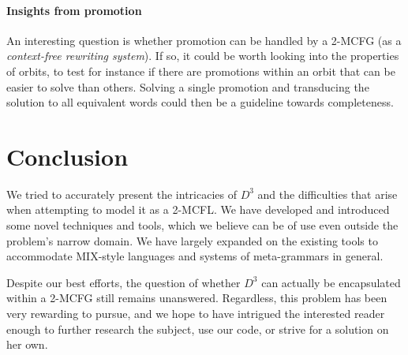 \documentclass{llncs}
\begin{document}
\paragraph{\textbf{Insights from promotion}}
An interesting question is whether promotion can be handled by a 2-MCFG (as a \textit{context-free rewriting system}). If so, it could be worth looking into the properties of orbits, to test for instance if there are promotions within an orbit that can be easier to solve than others. Solving a single promotion and transducing the solution to all equivalent words could then be a guideline towards completeness. 

\section{Conclusion}
We tried to accurately present the intricacies of $D^3$ and the difficulties that arise when attempting to model it as a 2-MCFL. We have developed and introduced some novel techniques and tools, which we believe can be of use even outside the problem's narrow domain. We have largely expanded on the existing tools to accommodate MIX-style languages and systems of meta-grammars in general.

Despite our best efforts, the question of whether $D^3$ can actually be encapsulated within a 2-MCFG still remains unanswered. Regardless, this problem has been very rewarding to pursue, and we hope to have intrigued the interested reader enough to further research the subject, use our code, or strive for a solution on her own.

\end{document}

